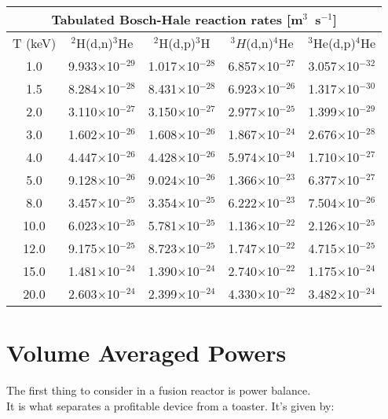 \begin{table}[h!]\small
  \noindent
  \centering
  \begin{tabular}{c | c c | c | c}
    \multicolumn{5}{c}{Tabulated Bosch-Hale reaction rates [m$^3$~s$^{-1}$]}\\
    \hline
    T (keV) & $^2$H(d,n)$^3$He & $^2$H(d,p)$^3$H & $^3H$(d,n)$^4$He & $^3$He(d,p)$^4$He\\
    \hline\hline
    1.0& 9.933$\times$10$^{-29}$ & 1.017$\times$10$^{-28}$ & 6.857$\times$10$^{-27}$ & 3.057$\times$10$^{-32}$ \\
    1.5  & 8.284$\times$10$^{-28}$ & 8.431$\times$10$^{-28}$ & 6.923$\times$10$^{-26}$ & 1.317$\times$10$^{-30}$ \\
    2.0  & 3.110$\times$10$^{-27}$ & 3.150$\times$10$^{-27}$ & 2.977$\times$10$^{-25}$ & 1.399$\times$10$^{-29}$ \\
    3.0  & 1.602$\times$10$^{-26}$ & 1.608$\times$10$^{-26}$ & 1.867$\times$10$^{-24}$ & 2.676$\times$10$^{-28}$ \\
    4.0  & 4.447$\times$10$^{-26}$ & 4.428$\times$10$^{-26}$ & 5.974$\times$10$^{-24}$ & 1.710$\times$10$^{-27}$ \\
    5.0  & 9.128$\times$10$^{-26}$ & 9.024$\times$10$^{-26}$ & 1.366$\times$10$^{-23}$ & 6.377$\times$10$^{-27}$ \\
    8.0  & 3.457$\times$10$^{-25}$ & 3.354$\times$10$^{-25}$ & 6.222$\times$10$^{-23}$ & 7.504$\times$10$^{-26}$ \\
   10.0  & 6.023$\times$10$^{-25}$ & 5.781$\times$10$^{-25}$ & 1.136$\times$10$^{-22}$ & 2.126$\times$10$^{-25}$ \\
   12.0  & 9.175$\times$10$^{-25}$ & 8.723$\times$10$^{-25}$ & 1.747$\times$10$^{-22}$ & 4.715$\times$10$^{-25}$ \\
   15.0  & 1.481$\times$10$^{-24}$ & 1.390$\times$10$^{-24}$ & 2.740$\times$10$^{-22}$ & 1.175$\times$10$^{-24}$ \\
   20.0& 2.603$\times$10$^{-24}$ & 2.399$\times$10$^{-24}$ & 4.330$\times$10$^{-22}$ & 3.482$\times$10$^{-24}$ \\
   \hline
  \end{tabular}
  \label{table:rr}
\end{table}

\section{Volume Averaged Powers}

The first thing to consider in a fusion reactor is power balance. \\ It is what separates a profitable device from a toaster. It's given by:

